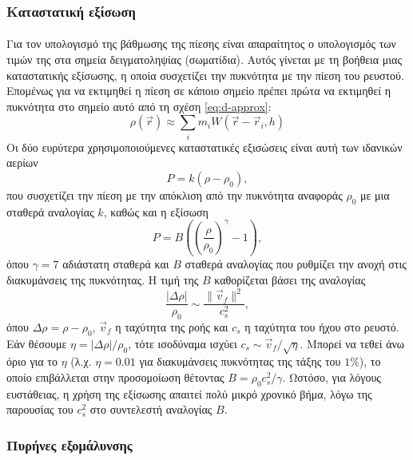 \subsubsection{Καταστατική εξίσωση}
\paragraph{} Για τον υπολογισμό της βάθμωσης της πίεσης είναι απαραίτητος ο υπολογισμός
των τιμών της στα σημεία δειγματοληψίας (σωματίδια). Αυτός γίνεται με τη βοήθεια μιας
καταστατικής εξίσωσης, η οποία συσχετίζει την πυκνότητα με την πίεση του ρευστού. Επομένως
για να εκτιμηθεί η πίεση σε κάποιο σημείο πρέπει πρώτα να εκτιμηθεί η πυκνότητα στο σημείο
αυτό από τη σχέση \ref{eq:d-approx}:
\begin{equation}
  \label{eq:dens-est}
  \rho(\vec{r}) \approx \sum_i m_i W(\vec{r}-\vec{r}_i, h)
\end{equation}
Οι δύο ευρύτερα χρησιμοποιούμενες καταστατικές εξισώσεις είναι αυτή των ιδανικών αερίων
\cite{muller2003particle, desbrun1996smoothed}
\begin{equation}
  \label{eq:ideal-state}
  P = k(\rho - \rho_0),
\end{equation}
που συσχετίζει την πίεση με την απόκλιση από την πυκνότητα αναφοράς $\rho_0$ με μια
σταθερά αναλογίας $k$, καθώς και η εξίσωση  \cite{becker2007weakly,
  monaghan20051703}
\begin{equation}
  \label{eq:tait-state}
  P = B \left( \left( \frac{\rho}{\rho_0} \right)^\gamma - 1 \right),
\end{equation}
όπου $\gamma=7$ αδιάστατη σταθερά και $B$ σταθερά αναλογίας που ρυθμίζει την ανοχή στις
διακυμάνσεις της πυκνότητας. Η τιμή της $B$ καθορίζεται βάσει της αναλογίας
\begin{equation}
  \label{eq:compressibility-scale}
  \frac{|\Delta\rho|}{\rho_0} \sim \frac{\|\vec{v}_f\|^2}{c_s^2},
\end{equation}
όπου $\Delta\rho = \rho - \rho_0$, $\vec{v}_f$ η ταχύτητα της ροής και $c_s$ η ταχύτητα
του ήχου στο ρευστό. Εάν θέσουμε $\eta = |\Delta\rho|/\rho_0$, τότε ισοδύναμα ισχύει
$c_s \sim \vec{v}_f / \sqrt{\eta}$.  Μπορεί να τεθεί άνω όριο για το $\eta$ (λ.χ.
$\eta = 0.01$ για διακυμάνσεις πυκνότητας της τάξης του $1\%$), το οποίο επιβάλλεται στην
προσομοίωση θέτοντας $B = \rho_0 c_s^2 / \gamma$.  Ωστόσο, για λόγους ευστάθειας, η χρήση
της εξίσωσης  απαιτεί πολύ μικρό χρονικό βήμα, λόγω της παρουσίας του $c_s^2$
στο συντελεστή αναλογίας $B$.

\subsubsection{Πυρήνες εξομάλυνσης}

